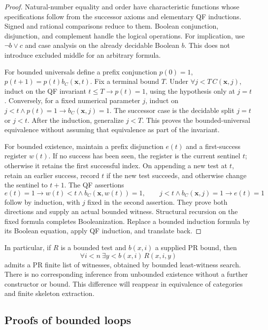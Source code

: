 \begin{proof}
Natural-number equality and order have characteristic functions whose
specifications follow from the successor axioms and elementary QF inductions.
Signed and rational comparisons reduce to them. Boolean conjunction,
disjunction, and complement handle the logical operations. For implication,
use $\neg b\vee c$ and case analysis on the already decidable Boolean $b$.
This does not introduce excluded middle for an arbitrary formula.

For bounded universals define a prefix conjunction
$p(0)=1$, $p(t+1)=p(t)b_C(\boldsymbol x,t)$. Fix a terminal bound $T$.
Under $\forall j<T\,C(\boldsymbol x,j)$, induct on the QF invariant
$t\le T\to p(t)=1$, using the hypothesis only at $j=t$.
Conversely, for a fixed numerical parameter $j$, induct on
$j<t\wedge p(t)=1\to b_C(\boldsymbol x,j)=1$.
The successor case is the decidable split $j=t$ or $j<t$.
After the induction, generalize $j<T$. This proves the bounded-universal
equivalence without assuming that equivalence as part of the invariant.

For bounded existence, maintain a prefix disjunction $e(t)$ and a first-success
register $w(t)$. If no success has been seen, the register is the current
sentinel $t$; otherwise it retains the first successful index. On appending a
new test at $t$, retain an earlier success, record $t$ if the new test succeeds,
and otherwise change the sentinel to $t+1$. The QF assertions
\[
 e(t)=1\to w(t)<t\wedge b_C(\boldsymbol x,w(t))=1,
 \qquad j<t\wedge b_C(\boldsymbol x,j)=1\to e(t)=1
\]
follow by induction, with $j$ fixed in the second assertion. They prove both
directions and supply an actual bounded witness. Structural recursion on the
fixed formula completes Booleanization. Replace a bounded induction formula by
its Boolean equation, apply QF induction, and translate back.
\end{proof}

In particular, if $R$ is a bounded test and $b(x,i)$ a supplied PR bound, then
\[
 \forall i<n\ \exists y<b(x,i)\,R(x,i,y)
\]
admits a PR finite list of witnesses, obtained by bounded least-witness search.
There is no corresponding inference from unbounded existence without a further
constructor or bound. This difference will reappear in equivalence of
categories and finite skeleton extraction.

\subsection{Proofs of bounded loops}

